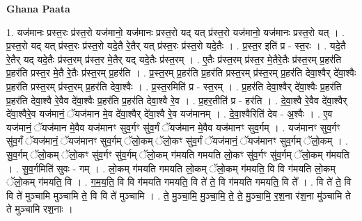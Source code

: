 \documentclass[17pt]{extarticle}
\begin{document}
\textbf{Ghana Paata } \newline

1. यज॑मानः प्रस्त॒रः प्र॑स्त॒रो यज॑मानो॒ यज॑मानः प्रस्त॒रो यद् यत् प्र॑स्त॒रो यज॑मानो॒ यज॑मानः प्रस्त॒रो यत् । . प्र॒स्त॒रो यद् यत् प्र॑स्त॒रः प्र॑स्त॒रो यदे॒तै रे॒तैर् यत् प्र॑स्त॒रः प्र॑स्त॒रो यदे॒तैः । . प्र॒स्त॒र इति॑ प्र - स्त॒रः । . यदे॒तै रे॒तैर् यद् यदे॒तैः प्र॑स्त॒रम् प्र॑स्त॒र मे॒तैर् यद् यदे॒तैः प्र॑स्त॒रम् । . ए॒तैः प्र॑स्त॒रम् प्र॑स्त॒र मे॒तैरे॒तैः प्र॑स्त॒रम् प्र॒हर॑ति प्र॒हर॑ति प्रस्त॒र मे॒तै रे॒तैः प्र॑स्त॒रम् प्र॒हर॑ति । . प्र॒स्त॒रम् प्र॒हर॑ति प्र॒हर॑ति प्रस्त॒रम् प्र॑स्त॒रम् प्र॒हर॑ति देवा॒श्वैर् दे॑वा॒श्वैः प्र॒हर॑ति प्रस्त॒रम् प्र॑स्त॒रम् प्र॒हर॑ति देवा॒श्वैः । . प्र॒स्त॒रमिति॑ प्र - स्त॒रम् । . प्र॒हर॑ति देवा॒श्वैर् दे॑वा॒श्वैः प्र॒हर॑ति प्र॒हर॑ति देवा॒श्वै रे॒वैव दे॑वा॒श्वैः प्र॒हर॑ति प्र॒हर॑ति देवा॒श्वै रे॒व । . प्र॒हर॒तीति॑ प्र - हर॑ति । . दे॒वा॒श्वै रे॒वैव दे॑वा॒श्वैर् दे॑वा॒श्वैरे॒व यज॑मानं॒ ॅयज॑मान मे॒व दे॑वा॒श्वैर् दे॑वा॒श्वै रे॒व यज॑मानम् । . दे॒वा॒श्वैरिति॑ देव - अ॒श्वैः । . ए॒व यज॑मानं॒ ॅयज॑मान मे॒वैव यज॑मानꣳ सुव॒र्गꣳ सु॑व॒र्गं ॅयज॑मान मे॒वैव यज॑मानꣳ सुव॒र्गम् । . यज॑मानꣳ सुव॒र्गꣳ सु॑व॒र्गं ॅयज॑मानं॒ ॅयज॑मानꣳ सुव॒र्गम् ॅलो॒कम् ॅलो॒कꣳ सु॑व॒र्गं ॅयज॑मानं॒ ॅयज॑मानꣳ सुव॒र्गम् ॅलो॒कम् । . सु॒व॒र्गम् ॅलो॒कम् ॅलो॒कꣳ सु॑व॒र्गꣳ सु॑व॒र्गम् ॅलो॒कम् ग॑मयति गमयति लो॒कꣳ सु॑व॒र्गꣳ सु॑व॒र्गम् ॅलो॒कम् ग॑मयति । . सु॒व॒र्गमिति॑ सुवः - गम् । . लो॒कम् ग॑मयति गमयति लो॒कम् ॅलो॒कम् ग॑मयति॒ वि वि ग॑मयति लो॒कम् ॅलो॒कम् ग॑मयति॒ वि । . ग॒म॒य॒ति॒ वि वि ग॑मयति गमयति॒ वि ते॑ ते॒ वि ग॑मयति गमयति॒ वि ते᳚ । . वि ते॑ ते॒ वि वि ते॑ मुञ्चामि मुञ्चामि ते॒ वि वि ते॑ मुञ्चामि । . ते॒ मु॒ञ्चा॒मि॒ मु॒ञ्चा॒मि॒ ते॒ ते॒ मु॒ञ्चा॒मि॒ र॒श॒ना र॑श॒ना मु॑ञ्चामि ते ते मुञ्चामि रश॒नाः । \newline
\end{document}
